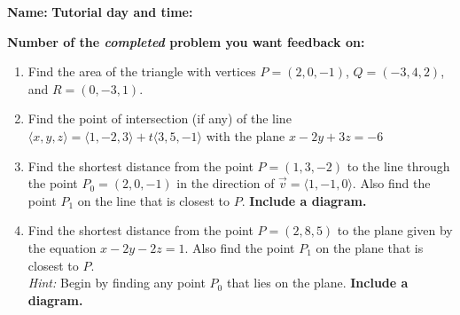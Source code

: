 \documentclass[12pt]{article}
\begin{document}
{\bf \large Name:} \hspace{2.5in} {\bf Tutorial day and time:}

\bigskip

{\bf Number of the {\em completed} problem you want feedback on:}

\bigskip


\thispagestyle{fancy}
 \begin{enumerate}
 
 \item Find the area of the triangle with vertices $P=(2,0,-1)$, $Q=(-3,4,2)$, and $R=(0,-3,1)$.

\vspace{3in}

 \item Find the point of intersection (if any) of the line $\langle x,y,z\rangle =  \langle 1, -2, 3\rangle+t\langle 3, 5, -1\rangle$ with the plane $x-2y+3z=-6$


\newpage

\item Find the shortest distance from the point $P=(1,3,-2)$ to the line through the point $P_0 = (2,0,-1)$ in the direction of $\vec{v} = \langle 1, -1, 0\rangle$. Also find the point $P_1$ on the line that is closest to $P$. {\bf Include a diagram.}

\vspace{4in}

\item Find the shortest distance from the point $P=(2,8,5)$ to the plane given by the equation $x-2y-2z=1$. Also find the point $P_1$ on the plane that is closest to $P$. \\
{\em Hint:} Begin by finding any point $P_0$ that lies on the plane. {\bf Include a diagram.}

 \end{enumerate}
\end{document}

